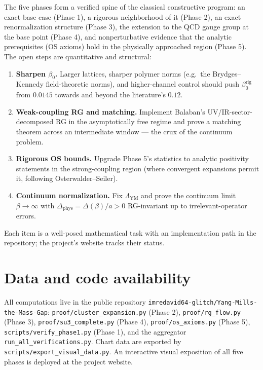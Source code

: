 \documentclass[11pt,a4paper]{article}
\newcommand{\gap}{\Delta}
\newcommand{\betaZ}{\beta_0}
\newcommand{\LambdaYM}{\Lambda_{\mathrm{YM}}}
\begin{document}
The five phases form a verified spine of the classical constructive
program: an exact base case (Phase 1), a rigorous neighborhood of it (Phase
2), an exact renormalization structure (Phase 3), the extension to the QCD
gauge group at the base point (Phase 4), and nonperturbative evidence that
the analytic prerequisites (OS axioms) hold in the physically approached
region (Phase 5).  The open steps are quantitative and structural:

\begin{enumerate}[leftmargin=1.5em]
  \item \textbf{Sharpen $\betaZ$.}  Larger lattices, sharper polymer norms
    (e.g.\ the Brydges--Kennedy field-theoretic norms), and higher-channel
    control should push $\betaZ^{\mathrm{rig}}$ from $0.0145$ towards and
    beyond the literature's $0.12$.
  \item \textbf{Weak-coupling RG and matching.}  Implement Balaban's
    UV/IR-sector-decomposed RG \cite{balaban1981, balaban1983,
    brydges1998} in the asymptotically free regime and prove a matching
    theorem across an intermediate window --- the crux of the continuum
    problem.
  \item \textbf{Rigorous OS bounds.}  Upgrade Phase 5's statistics to
    analytic positivity statements in the strong-coupling region (where
    convergent expansions permit it, following Osterwalder--Seiler).
  \item \textbf{Continuum normalization.}  Fix $\LambdaYM$ and prove the
    continuum limit $\beta \to \infty$ with $\gap_{\mathrm{phys}} =
    \gap(\beta)/a > 0$ RG-invariant up to irrelevant-operator errors.
\end{enumerate}

Each item is a well-posed mathematical task with an implementation path in
the repository; the project's website tracks their status.

\section*{Data and code availability}

All computations live in the public repository
\texttt{imredavid64-glitch/Yang-Mills-the-Mass-Gap}:
\texttt{proof/cluster\_expansion.py} (Phase 2), \texttt{proof/rg\_flow.py}
(Phase 3), \texttt{proof/su3\_complete.py} (Phase 4),
\texttt{proof/os\_axioms.py} (Phase 5), \texttt{scripts/verify\_phase1.py}
(Phase 1), and the aggregator \texttt{run\_all\_verifications.py}.  Chart
data are exported by \texttt{scripts/export\_visual\_data.py}.  An
interactive visual exposition of all five phases is deployed at the
project website.
\end{document}
